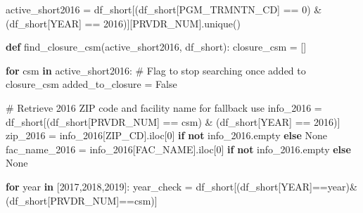 \documentclass[
  letterpaper,
  DIV=11,
  numbers=noendperiod]{scrartcl}
\newenvironment{Shaded}{\begin{snugshade}}{\end{snugshade}}
\newcommand{\CommentTok}[1]{\textcolor[rgb]{0.37,0.37,0.37}{#1}}
\newcommand{\ControlFlowTok}[1]{\textcolor[rgb]{0.00,0.23,0.31}{\textbf{#1}}}
\newcommand{\DecValTok}[1]{\textcolor[rgb]{0.68,0.00,0.00}{#1}}
\newcommand{\KeywordTok}[1]{\textcolor[rgb]{0.00,0.23,0.31}{\textbf{#1}}}
\newcommand{\NormalTok}[1]{\textcolor[rgb]{0.00,0.23,0.31}{#1}}
\newcommand{\OperatorTok}[1]{\textcolor[rgb]{0.37,0.37,0.37}{#1}}
\newcommand{\StringTok}[1]{\textcolor[rgb]{0.13,0.47,0.30}{#1}}
\newcommand{\VariableTok}[1]{\textcolor[rgb]{0.07,0.07,0.07}{#1}}
\begin{document}
\begin{Shaded}
\begin{Highlighting}[]
\NormalTok{active\_short2016 }\OperatorTok{=}\NormalTok{ df\_short[(df\_short[}\StringTok{\textquotesingle{}PGM\_TRMNTN\_CD\textquotesingle{}}\NormalTok{] }\OperatorTok{==} \DecValTok{0}\NormalTok{) }\OperatorTok{\&}\NormalTok{ (df\_short[}\StringTok{\textquotesingle{}YEAR\textquotesingle{}}\NormalTok{] }\OperatorTok{==} \DecValTok{2016}\NormalTok{)][}\StringTok{\textquotesingle{}PRVDR\_NUM\textquotesingle{}}\NormalTok{].unique()}

\KeywordTok{def}\NormalTok{ find\_closure\_csm(active\_short2016, df\_short):}
\NormalTok{  closure\_csm }\OperatorTok{=}\NormalTok{ []}

  \ControlFlowTok{for}\NormalTok{ csm }\KeywordTok{in}\NormalTok{ active\_short2016:}
    \CommentTok{\# Flag to stop searching once added to closure\_csm}
\NormalTok{    added\_to\_closure }\OperatorTok{=} \VariableTok{False}

    \CommentTok{\# Retrieve 2016 ZIP code and facility name for fallback use}
\NormalTok{    info\_2016 }\OperatorTok{=}\NormalTok{ df\_short[(df\_short[}\StringTok{\textquotesingle{}PRVDR\_NUM\textquotesingle{}}\NormalTok{] }\OperatorTok{==}\NormalTok{ csm) }\OperatorTok{\&}\NormalTok{ (df\_short[}\StringTok{\textquotesingle{}YEAR\textquotesingle{}}\NormalTok{] }\OperatorTok{==} \DecValTok{2016}\NormalTok{)]}
\NormalTok{    zip\_2016 }\OperatorTok{=}\NormalTok{ info\_2016[}\StringTok{\textquotesingle{}ZIP\_CD\textquotesingle{}}\NormalTok{].iloc[}\DecValTok{0}\NormalTok{] }\ControlFlowTok{if} \KeywordTok{not}\NormalTok{ info\_2016.empty }\ControlFlowTok{else} \VariableTok{None}
\NormalTok{    fac\_name\_2016 }\OperatorTok{=}\NormalTok{ info\_2016[}\StringTok{\textquotesingle{}FAC\_NAME\textquotesingle{}}\NormalTok{].iloc[}\DecValTok{0}\NormalTok{] }\ControlFlowTok{if} \KeywordTok{not}\NormalTok{ info\_2016.empty }\ControlFlowTok{else} \VariableTok{None}

    \ControlFlowTok{for}\NormalTok{ year }\KeywordTok{in}\NormalTok{ [}\DecValTok{2017}\NormalTok{,}\DecValTok{2018}\NormalTok{,}\DecValTok{2019}\NormalTok{]:}
\NormalTok{      year\_check }\OperatorTok{=}\NormalTok{ df\_short[(df\_short[}\StringTok{\textquotesingle{}YEAR\textquotesingle{}}\NormalTok{]}\OperatorTok{==}\NormalTok{year)}\OperatorTok{\&}\NormalTok{(df\_short[}\StringTok{\textquotesingle{}PRVDR\_NUM\textquotesingle{}}\NormalTok{]}\OperatorTok{==}\NormalTok{csm)]}


\end{Highlighting}
\end{Shaded}
\end{document}
